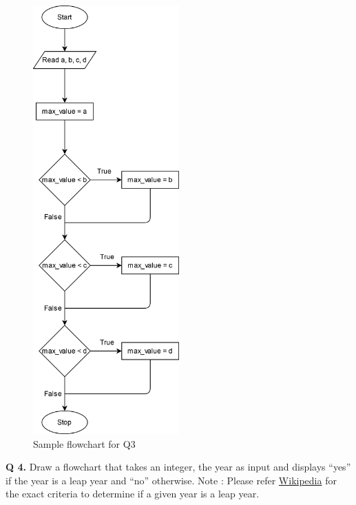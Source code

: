\documentclass{article}
\begin{document}
\begin{figure}[ht]
    \centering
    \includegraphics[width=0.5\textwidth]{Q3.png}
    \caption{Sample flowchart for Q3}
    \label{Q3}
\end{figure}

\clearpage

\begin{flushleft}

\textbf{Q 4.} Draw a flowchart that takes an integer, the year as input and 
displays “yes” if the year is a leap year and “no” otherwise.
Note : Please refer 
\href{https://en.wikipedia.org/wiki/Leap_year#Algorithm}{Wikipedia} for the exact 
criteria to determine if a given year is a leap year.

\end{flushleft}
\end{document}
